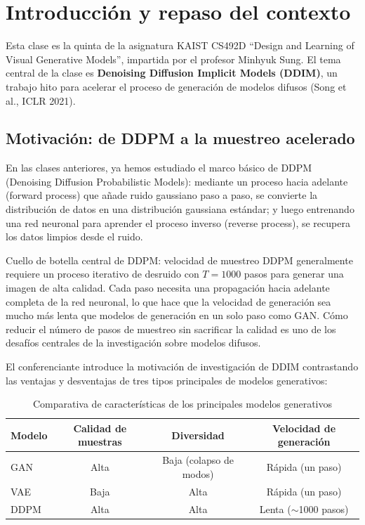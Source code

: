 \section{Introducción y repaso del contexto}

Esta clase es la quinta de la asignatura KAIST CS492D ``Design and Learning of Visual Generative Models'', impartida por el profesor Minhyuk Sung. El tema central de la clase es \textbf{Denoising Diffusion Implicit Models (DDIM)}, un trabajo hito para acelerar el proceso de generación de modelos difusos (Song et al., ICLR 2021).

\subsection{Motivación: de DDPM a la muestreo acelerado}

En las clases anteriores, ya hemos estudiado el marco básico de DDPM (Denoising Diffusion Probabilistic Models): mediante un proceso hacia adelante (forward process) que añade ruido gaussiano paso a paso, se convierte la distribución de datos en una distribución gaussiana estándar; y luego entrenando una red neuronal para aprender el proceso inverso (reverse process), se recupera los datos limpios desde el ruido.

\begin{importantbox}{Cuello de botella central de DDPM: velocidad de muestreo}
DDPM generalmente requiere un proceso iterativo de desruido con $T=1000$ pasos para generar una imagen de alta calidad. Cada paso necesita una propagación hacia adelante completa de la red neuronal, lo que hace que la velocidad de generación sea mucho más lenta que modelos de generación en un solo paso como GAN. Cómo reducir el número de pasos de muestreo sin sacrificar la calidad es uno de los desafíos centrales de la investigación sobre modelos difusos.
\end{importantbox}

El conferenciante introduce la motivación de investigación de DDIM contrastando las ventajas y desventajas de tres tipos principales de modelos generativos:

\begin{table}[H]
\centering
\caption{Comparativa de características de los principales modelos generativos}
\begin{tabular}{lccc}
\toprule
\textbf{Modelo} & \textbf{Calidad de muestras} & \textbf{Diversidad} & \textbf{Velocidad de generación} \\
\midrule
GAN & Alta & Baja (colapso de modos) & Rápida (un paso) \\
VAE & Baja & Alta & Rápida (un paso) \\
DDPM & Alta & Alta & Lenta ($\sim$1000 pasos) \\
\bottomrule
\end{tabular}
\end{table}

